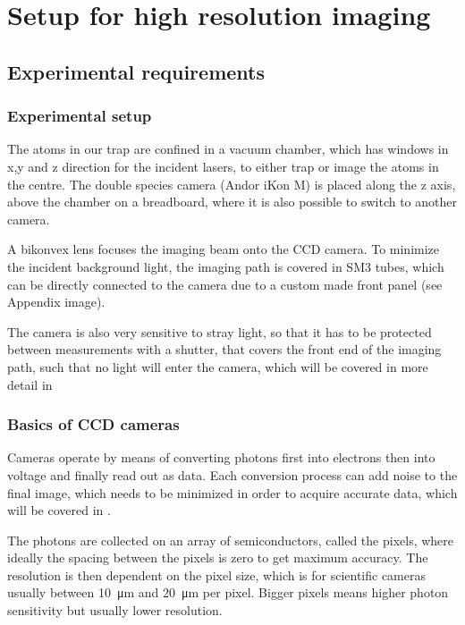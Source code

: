 \chapter{Setup for high resolution imaging}

\section{Experimental requirements}

\subsection{Experimental setup}
	The atoms in our trap are confined in a vacuum chamber, which has windows in x,y and z direction for the incident lasers, to either trap or image the atoms in the centre. The double species camera (Andor iKon M) is placed along the z axis, above the chamber on a breadboard, where it is also possible to switch to another camera.
	
	A bikonvex lens focuses the imaging beam onto the CCD camera. To minimize the incident background light, the imaging path is covered in SM3 tubes, which can be directly connected to the camera due to a custom made front panel (see Appendix image). 
	
	The camera is also very sensitive to stray light, so that it has to be protected between measurements with a shutter, that covers the front end of the imaging path, such that no light will enter the camera, which will be covered in more detail in 
	

\subsection{Basics of CCD cameras}
\label{ch:ccd_basics}
	
	Cameras operate by means of converting photons first into electrons then into voltage and finally read out as data. Each conversion process can add noise to the final image, which needs to be minimized in order to acquire accurate data, which will be covered in .
	
	The photons are collected on an array of semiconductors, called the pixels, where ideally the spacing between the pixels is zero to get maximum accuracy. The resolution is then dependent on the pixel size, which is for scientific cameras usually between \SI{10}{\micro\meter} and \SI{20}{\micro\meter} per pixel. Bigger pixels means higher photon sensitivity but usually lower resolution.
	
